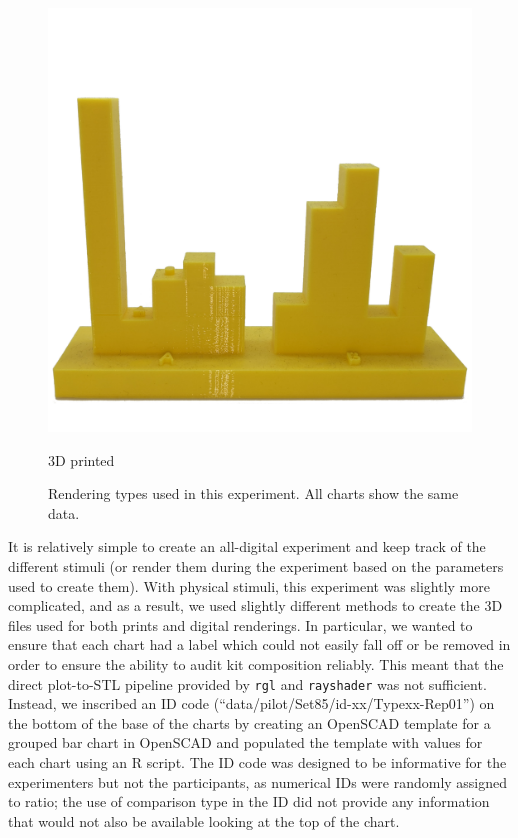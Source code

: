 \documentclass[runningheads
]{llncs}
\begin{document}
\begin{figure}
\begin{minipage}[b]{0.25\linewidth}
{{\includegraphics{image/id04-type1-rep01-printed.png}

}

\caption{3D printed}

}

\end{minipage}%

\caption{\label{fig-chart-types}Rendering types used in this experiment.
All charts show the same data.}

\end{figure}

It is relatively simple to create an all-digital experiment and keep
track of the different stimuli (or render them during the experiment
based on the parameters used to create them). With physical stimuli,
this experiment was slightly more complicated, and as a result, we used
slightly different methods to create the 3D files used for both prints
and digital renderings. In particular, we wanted to ensure that each
chart had a label which could not easily fall off or be removed in order
to ensure the ability to audit kit composition reliably. This meant that
the direct plot-to-STL pipeline provided by \texttt{rgl} \autocite{rgl}
and \texttt{rayshader} \autocite{rayshader} was not sufficient. Instead,
we inscribed an ID code (``data/pilot/Set85/id-xx/Typexx-Rep01'') on the
bottom of the base of the charts by creating an OpenSCAD
\autocite{mariuskintelOpenSCADDocumentation2023} template for a grouped
bar chart in OpenSCAD and populated the template with values for each
chart using an R script. The ID code was designed to be informative for
the experimenters but not the participants, as numerical IDs were
randomly assigned to ratio; the use of comparison type in the ID did not
provide any information that would not also be available looking at the
top of the chart.
\end{document}

